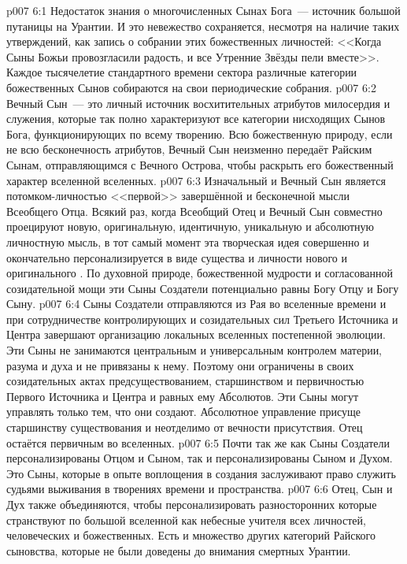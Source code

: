\vs p007 6:1 Недостаток знания о многочисленных Сынах Бога~--- источник большой путаницы на Урантии. И это невежество сохраняется, несмотря на наличие таких утверждений, как запись о собрании этих божественных личностей: <<Когда Сыны Божьи провозгласили радость, и все Утренние Звёзды пели вместе>>. Каждое тысячелетие стандартного времени сектора различные категории божественных Сынов собираются на свои периодические собрания.
\vs p007 6:2 Вечный Сын~--- это личный источник восхитительных атрибутов милосердия и служения, которые так полно характеризуют все категории нисходящих Сынов Бога, функционирующих по всему творению. Всю божественную природу, если не всю бесконечность атрибутов, Вечный Сын неизменно передаёт Райским Сынам, отправляющимся с Вечного Острова, чтобы раскрыть его божественный характер вселенной вселенных.
\vs p007 6:3 \pc Изначальный и Вечный Сын является потомком\hyp{}личностью <<первой>> завершённой и бесконечной мысли Всеобщего Отца. Всякий раз, когда Всеобщий Отец и Вечный Сын совместно проецируют новую, оригинальную, идентичную, уникальную и абсолютную личностную мысль, в тот самый момент эта творческая идея совершенно и окончательно персонализируется в виде существа и личности нового и оригинального . По духовной природе, божественной мудрости и согласованной созидательной мощи эти Сыны Создатели потенциально равны Богу Отцу и Богу Сыну.
\vs p007 6:4 Сыны Создатели отправляются из Рая во вселенные времени и при сотрудничестве контролирующих и созидательных сил Третьего Источника и Центра завершают организацию локальных вселенных постепенной эволюции. Эти Сыны не занимаются центральным и универсальным контролем материи, разума и духа и не привязаны к нему. Поэтому они ограничены в своих созидательных актах предсуществованием, старшинством и первичностью Первого Источника и Центра и равных ему Абсолютов. Эти Сыны могут управлять только тем, что они создают. Абсолютное управление присуще старшинству существования и неотделимо от вечности присутствия. Отец остаётся первичным во вселенных.
\vs p007 6:5 \pc Почти так же как Сыны Создатели персонализированы Отцом и Сыном, так и  персонализированы Сыном и Духом. Это Сыны, которые в опыте воплощения в создания заслуживают право служить судьями выживания в творениях времени и пространства.
\vs p007 6:6 \pc Отец, Сын и Дух также объединяются, чтобы персонализировать разносторонних  которые странствуют по большой вселенной как небесные учителя всех личностей, человеческих и божественных. Есть и множество других категорий Райского сыновства, которые не были доведены до внимания смертных Урантии.
